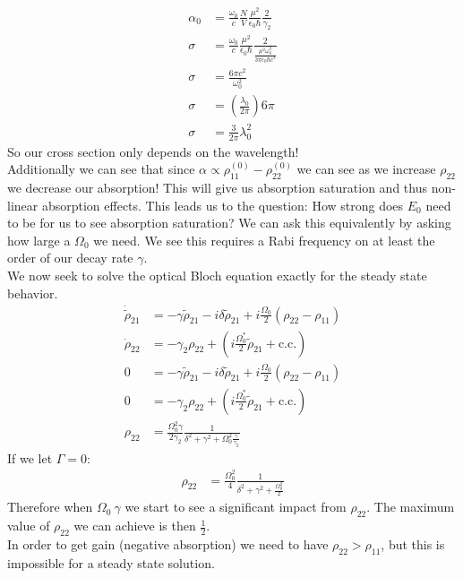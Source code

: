 \begin{align*}
	\alpha_0 &= \frac{\omega_0}{c} \frac{N}{V} \frac{\mu^2}{\epsilon_0\hbar} \frac{2}{\gamma_2} \\
	\sigma &= \frac{\omega_0}{c} \frac{\mu^2}{\epsilon_0\hbar} \frac{2}{\frac{\mu^2\omega_0^3}{3\pi\epsilon_0\hbar c^3}} \\
	\sigma &= \frac{6\pi c^2}{\omega_0^2} \\
	\sigma &= \left(\frac{\lambda_0}{2\pi}\right)6\pi \\
	\sigma &= \frac{3}{2\pi}\lambda_0^2
\end{align*}
So our cross section only depends on the wavelength! \\
Additionally we can see that since $\alpha \propto \rho_{11}^{(0)} - \rho_{22}^{(0)}$ we can see as we increase $\rho_{22}$ we decrease our absorption! This will give us absorption saturation and thus non-linear absorption effects.
This leads us to the question: How strong does $E_0$ need to be for us to see absorption saturation? We can ask this equivalently by asking how large a $\Omega_0$ we need. We see this requires a Rabi frequency on at least the order of our decay rate $\gamma$.\\
We now seek to solve the optical Bloch equation exactly for the steady state behavior.
\begin{align*}
	\dot{\tilde{\rho}}_{21} &= -\gamma\tilde{\rho}_{21} - i\delta\tilde{\rho}_{21} + i\frac{\Omega_0}{2}(\rho_{22} - \rho_{11}) \\
	\dot{\rho}_{22} &= -\gamma_2\rho_{22} + \left(i\frac{\Omega_0^*}{2}\tilde{\rho}_{21} +\text{c.c.}\right) \\
	0 &= -\gamma\tilde{\rho}_{21} - i\delta\tilde{\rho}_{21} + i\frac{\Omega_0}{2}(\rho_{22} - \rho_{11}) \\
	0 &= -\gamma_2\rho_{22} + \left(i\frac{\Omega_0^*}{2}\tilde{\rho}_{21} +\text{c.c.}\right) \\
	\rho_{22} &= \frac{\Omega_0^2\gamma}{2\gamma_2} \frac{1}{\delta^2 + \gamma^2 + \Omega_0^2\frac{\gamma}{\gamma_2}}
\end{align*}
If we let $\Gamma = 0$:
\begin{align*}
	\rho_{22} &= \frac{\Omega_0^2}{4} \frac{1}{\delta^2 + \gamma^2 + \frac{\Omega_0^2}{2}}
\end{align*}
Therefore when $\Omega_0 ~ \gamma$ we start to see a significant impact from $\rho_{22}$. The maximum value of $\rho_{22}$ we can achieve is then $\frac{1}{2}$. \\
In order to get gain (negative absorption) we need to have $\rho_{22} >\rho_{11}$, but this is impossible for a steady state solution. \\
